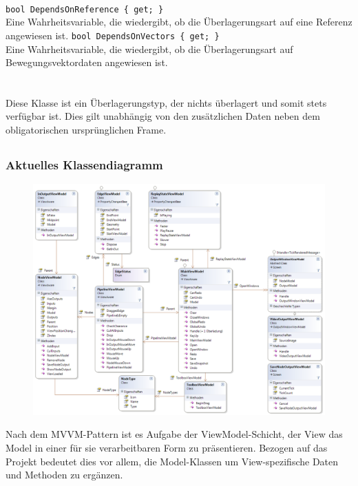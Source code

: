 \paragraph{}
\begin{itemize}
	\add \verb!bool DependsOnReference { get; }! \\
	Eine Wahrheitsvariable, die wiedergibt, ob die Überlagerungsart auf eine Referenz angewiesen ist.
	\add \verb!bool DependsOnVectors { get; }! \\
	Eine Wahrheitsvariable, die wiedergibt, ob die Überlagerungsart auf Bewegungsvektordaten angewiesen ist.
\end{itemize}

\paragraph{}~\\
Diese Klasse ist ein Überlagerungstyp, der nichts überlagert und somit stets verfügbar ist. Dies gilt unabhängig von den zusätzlichen Daten neben dem obligatorischen ursprünglichen Frame.
\newpage

\subsection{}

\subsubsection*{Aktuelles Klassendiagramm}
\begin{figure}[h!]
\begin{center}
\includegraphics[width=\textwidth]{classdiagram/viewmodel.png}
\end{center}
\end{figure}
Nach dem MVVM-Pattern ist es Aufgabe der ViewModel-Schicht, der View das Model in einer für sie verarbeitbaren Form zu präsentieren. Bezogen auf das Projekt bedeutet dies vor allem, die Model-Klassen um View-spezifische Daten und Methoden zu ergänzen.
\newpage

